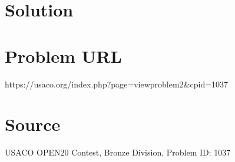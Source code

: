 \documentclass[12pt]{article}
\begin{document}
\section*{Solution}


\section*{Problem URL}
https://usaco.org/index.php?page=viewproblem2&cpid=1037

\section*{Source}
USACO OPEN20 Contest, Bronze Division, Problem ID: 1037
\end{document}
